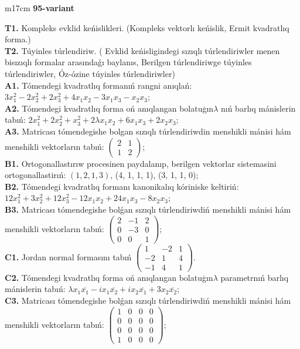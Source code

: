 \documentclass{article}
\begin{document}
\begin{tabular}{m{17cm}}
\textbf{95-variant}
\newline

\textbf{T1.} Kompleks evklid keńislikleri.  (Kompleks vektorlı keńislik, Ermit kvadratlıq forma.) \\
\textbf{T2.} Túyinles túrlendiriw. ( Evklid keńisligindegi sızıqlı túrlendiriwler menen bisızıqlı formalar arasındaǵı baylanıs, Berilgen túrlendiriwge túyinles túrlendiriwler, Óz-ózine túyinles túrlendiriwler) \\
\textbf{A1.} Tómendegi kvadratlıq formanıń rangni anıqlań: \(3x_{1}^{2} - 2x_{2}^{2} + 2x_{3}^{2} + 4x_{1}x_{2} - 3x_{1}x_{3} - x_{2}x_{3}\); \\
\textbf{A2.} Tómendegi kvadratlıq forma oń anıqlangan bolatuģın\(\lambda\) nıń barlıq mánislerin tabıń: \(2x_{1}^{2} + 2x_{2}^{2} + x_{3}^{2} + 2\lambda x_{1}x_{2} + 6x_{1}x_{3} + 2x_{2}x_{3}\); \\
\textbf{A3.} Matricası tómendegishe bolgan sızıqlı túrlendiriwdin menshikli mánisi hám menshikli vektorların tabıń: \(\begin{pmatrix} 2 & 1 \\ 1 & 2 \end{pmatrix}\); \\
\textbf{B1.} Ortogonallastırıw procesinen paydalanıp, berilgen vektorlar sistemasini ortogonallastirıń: \((1,2,1,3)\), (4, 1, 1, 1), (3, 1, 1, 0); \\
\textbf{B2.} Tómendegi kvadratlıq formanı kanonikalıq kóriniske keltiriń: \(12x_{1}^{2} + 3x_{2}^{2} + 12x_{3}^{2} - 12x_{1}x_{2} + 24x_{1}x_{3} - 8x_{2}x_{3}\); \\
\textbf{B3.} Matricası tómendegishe bolǵan sızıqlı túrlendiriwdiń menshikli mánisi hám menshikli vektorların tabıń: \(\begin{pmatrix} 2 & - 1 & 2 \\ 0 & - 3 & 0 \\ 0 & 0 & 1 \end{pmatrix}\); \\
\textbf{C1.} Jordan normal formasını tabıń \(\begin{pmatrix} 1 & - 2 & 1 \\  - 2 & 1 & 4 \\  - 1 & 4 & 1 \end{pmatrix}\). \\
\textbf{C2.} Tómendegi kvadratlıq forma oń anıqlangan bolatuģın\(\lambda\) parametrnıń barlıq mánislerin tabıń: \(\lambda x_{1}\overline{x_{1}} - ix_{1}\overline{x_{2}} + ix_{2}\overline{x_{1}} + 3x_{2}\overline{x_{2}}\); \\
\textbf{C3.} Matricası tómendegishe bolǵan sızıqlı túrlendiriwdiń menshikli mánisi hám menshikli vektorların tabıń: \(\begin{pmatrix} 1 & 0 & 0 & 0 \\ 0 & 0 & 0 & 0 \\ 0 & 0 & 0 & 0 \\ 1 & 0 & 0 & 0 \end{pmatrix}\); \\

\end{tabular}
\vspace{1cm}
\end{document}

